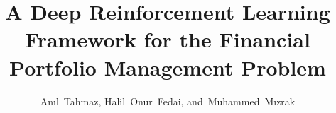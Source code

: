 \documentclass[journal,onecolumn]{IEEEtran}
\begin{document}
\title{A Deep Reinforcement Learning Framework for the
	Financial Portfolio Management Problem}


\author{Anıl~Tahmaz,
		Halil~Onur~Fedai,
        and~Muhammed~Mızrak}


\maketitle

\end{document}
